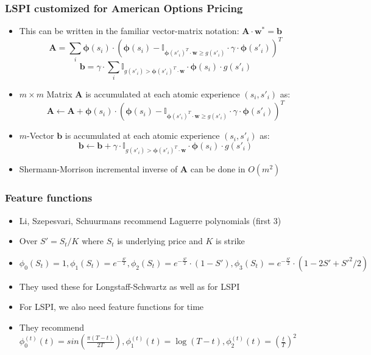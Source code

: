 \documentclass[handout]{beamer}
\begin{document}
\begin{frame}
\frametitle{LSPI customized for American Options Pricing}
\pause
\begin{itemize}[<+->]
\item This can be written in the familiar vector-matrix notation: $\bm{A} \cdot \bm{w}^* = \bm{b}$
$$\bm{A} = \sum_i \bm{\phi}(s_i) \cdot (\bm{\phi}(s_i) - \mathbb{I}_{\bm{\phi}(s'_i)^T  \cdot \bm{w} \geq g(s'_i)} \cdot \gamma \cdot \bm{\phi}(s'_i))^T$$
$$\bm{b} = \gamma \cdot \sum_i \mathbb{I}_{g(s'_i)  > \bm{\phi}(s'_i)^T \cdot  \bm{w}} \cdot \bm{\phi}(s_i) \cdot  g(s'_i)$$
\item $m \times m$ Matrix $\bm{A}$ is accumulated at each atomic experience $(s_i,s'_i)$ as:
$$\bm{A} \leftarrow \bm{A} + \bm{\phi}(s_i) \cdot (\bm{\phi}(s_i) -  \mathbb{I}_{\bm{\phi}(s'_i)^T \cdot \bm{w} \geq g(s'_i)} \cdot \gamma \cdot \bm{\phi}(s'_i))^T$$
\item $m$-Vector $\bm{b}$ is accumulated at each atomic experience $(s_i, s'_i)$ as:
$$\bm{b} \leftarrow \bm{b} + \gamma  \cdot \mathbb{I}_{g(s'_i) > \bm{\phi}(s'_i)^T  \cdot \bm{w}} \cdot \bm{\phi}(s_i) \cdot g(s'_i)$$
\item Shermann-Morrison incremental inverse of $\bm{A}$ can be done in $O(m^2)$
\end{itemize}
\end{frame}


\begin{frame}
\frametitle{Feature functions}
\pause
\begin{itemize}[<+->]
\item Li, Szepesvari, Schuurmans recommend Laguerre polynomials (first 3)
\item Over $S' = S_t/K$ where $S_t$ is underlying price and $K$ is strike
\item $\phi_0(S_t) = 1, \phi_1(S_t) = e^{-\frac {S'} 2}, \phi_2(S_t) = e^{-\frac{S'} 2} \cdot (1-S'), \phi_3(S_t) = e^{-\frac{S'} 2} \cdot (1-2S'+S'^2/2)$
\item They used these for Longstaff-Schwartz as well as for LSPI
\item For LSPI, we also need feature functions for time
\item They recommend $\phi_0^{(t)}(t) = sin(\frac {\pi(T-t)} {2T}), \phi_1^{(t)}(t) = \log(T-t), \phi_2^{(t)}(t) = (\frac t T)^2$
\end{itemize}
\end{frame}
\end{document}
